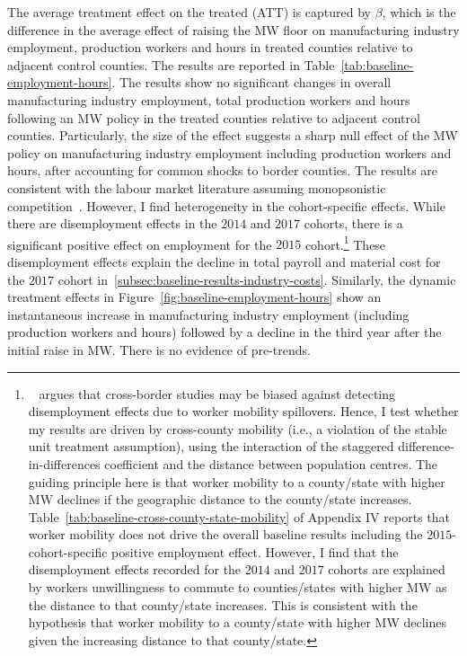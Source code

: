 \documentclass[12pt, english]{article}
\begin{document}
    The average treatment effect on the treated (ATT) is captured by $\beta$, which is the difference in the average effect of raising the MW floor on manufacturing industry employment, production workers and hours in treated counties relative to adjacent control counties. The results are reported in Table~\ref{tab:baseline-employment-hours}. The results show no significant changes in overall manufacturing industry employment, total production workers and hours following an MW policy in the treated counties relative to adjacent control counties. Particularly, the size of the effect suggests a sharp null effect of the MW policy on manufacturing industry employment including production workers and hours, after accounting for common shocks to border counties. The results are consistent with the labour market literature assuming monopsonistic competition~\parencite{card2000minimum, aaronson2018industry, cengiz2019effect, wong2019minimum, dustmann2022reallocation}. However, I find heterogeneity in the cohort-specific effects. While there are disemployment effects in the $2014$ and $2017$ cohorts, there is a significant positive effect on employment for the $2015$ cohort.\footnote{\tiny~\cite{neumark2019econometrics} argues that cross-border studies may be biased against detecting disemployment effects due to worker mobility spillovers. Hence, I test whether my results are driven by cross-county mobility (i.e., a violation of the stable unit treatment assumption), using the interaction of the staggered difference-in-differences coefficient and the distance between population centres. The guiding principle here is that worker mobility to a county/state with higher MW declines if the geographic distance to the county/state increases. Table~\ref{tab:baseline-cross-county-state-mobility} of Appendix IV reports that worker mobility does not drive the overall baseline results including the $2015$-cohort-specific positive employment effect. However, I find that the disemployment effects recorded for the $2014$ and $2017$ cohorts are explained by workers unwillingness to commute to counties/states with higher MW as the distance to that county/state increases. This is consistent with the hypothesis that worker mobility to a county/state with higher MW declines given the increasing distance to that county/state.} These disemployment effects explain the decline in total payroll and material cost for the $2017$ cohort in~\ref{subsec:baseline-results-industry-costs}. Similarly, the dynamic treatment effects in Figure~\ref{fig:baseline-employment-hours} show an instantaneous increase in manufacturing industry employment (including production workers and hours) followed by a decline in the third year after the initial raise in MW. There is no evidence of pre-trends.
    
\end{document}
